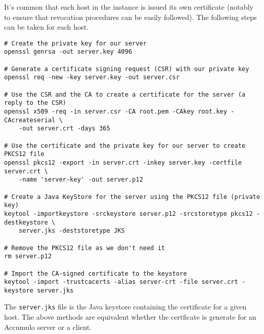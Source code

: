 It's common that each host in the instance is issued its own certificate (notably to ensure that revocation procedures
can be easily followed). The following steps can be taken for each host.

\begin{verbatim}
# Create the private key for our server
openssl genrsa -out server.key 4096

# Generate a certificate signing request (CSR) with our private key
openssl req -new -key server.key -out server.csr

# Use the CSR and the CA to create a certificate for the server (a reply to the CSR)
openssl x509 -req -in server.csr -CA root.pem -CAkey root.key -CAcreateserial \
    -out server.crt -days 365

# Use the certificate and the private key for our server to create PKCS12 file
openssl pkcs12 -export -in server.crt -inkey server.key -certfile server.crt \
    -name 'server-key' -out server.p12

# Create a Java KeyStore for the server using the PKCS12 file (private key)
keytool -importkeystore -srckeystore server.p12 -srcstoretype pkcs12 -destkeystore \
    server.jks -deststoretype JKS

# Remove the PKCS12 file as we don't need it
rm server.p12

# Import the CA-signed certificate to the keystore
keytool -import -trustcacerts -alias server-crt -file server.crt -keystore server.jks
\end{verbatim}

The \texttt{server.jks} file is the Java keystore containing the certificate for a given host. The above
methods are equivalent whether the certficate is generate for an Accumulo server or a client.
